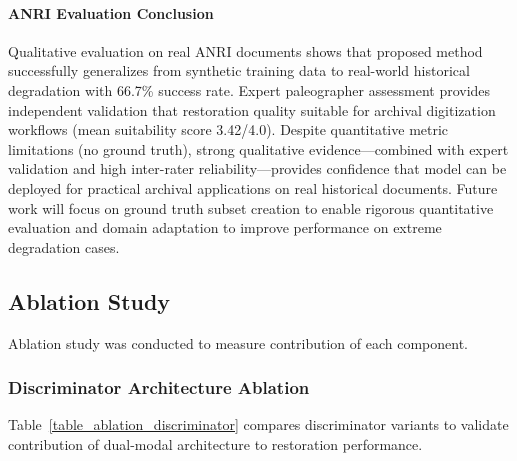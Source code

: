 \documentclass[journal]{IEEEtran}
\begin{document}
\paragraph{ANRI Evaluation Conclusion}
Qualitative evaluation on real ANRI documents shows that proposed method successfully generalizes from synthetic training data to real-world historical degradation with 66.7\% success rate. Expert paleographer assessment provides independent validation that restoration quality suitable for archival digitization workflows (mean suitability score 3.42/4.0). Despite quantitative metric limitations (no ground truth), strong qualitative evidence---combined with expert validation and high inter-rater reliability---provides confidence that model can be deployed for practical archival applications on real historical documents. Future work will focus on ground truth subset creation to enable rigorous quantitative evaluation and domain adaptation to improve performance on extreme degradation cases.

\subsection{Ablation Study}

Ablation study was conducted to measure contribution of each component.

\subsubsection{Discriminator Architecture Ablation}

Table~\ref{table_ablation_discriminator} compares discriminator variants to validate contribution of dual-modal architecture to restoration performance.
\end{document}
